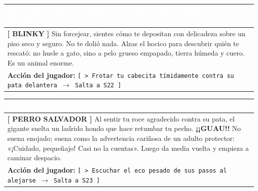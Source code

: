 \documentclass[11pt, a4paper]{article}
\begin{document}
\noindent
\begin{tabularx}{\textwidth}{|X|}
\hline
\rowcolor{colorHeader}
\textbf{\textcolor{white}{PANTALLA S21 $\cdot$ El Gigante de Pelaje Mojado}} \hfill \small\textcolor{white}{Sentido: Tacto y Olor Fuerte} \\ \hline
\rowcolor{colorTextoBox}
\textbf{\textcolor{colorEmisor}{[ BLINKY ]}} \vspace{0.2em}\newline
Sin forcejear, sientes cómo te depositan con delicadeza sobre un piso seco y seguro. No te dolió nada. Alzas el hocico para descubrir quién te rescató: no huele a gato, sino a pelo grueso empapado, tierra húmeda y cuero. Es un animal enorme. \\ \hline
\rowcolor{colorBotonBox}
\textbf{Acción del jugador:} \newline
\texttt{[ > Frotar tu cabecita tímidamente contra su pata delantera $\rightarrow$ Salta a S22 ]} \\ \hline
\end{tabularx}

\vspace{1em}

\noindent
\begin{tabularx}{\textwidth}{|X|}
\hline
\rowcolor{colorHeader}
\textbf{\textcolor{white}{PANTALLA S22 $\cdot$ La Voz del Perro}} \hfill \small\textcolor{white}{Sentido: Oído Grave y Vibración} \\ \hline
\rowcolor{colorTextoBox}
\textbf{\textcolor{colorEmisor}{[ PERRO SALVADOR ]}} \vspace{0.2em}\newline
Al sentir tu roce agradecido contra su pata, el gigante suelta un ladrido hondo que hace retumbar tu pecho. \textbf{¡¡GUAU!!} No suena enojado; suena como la advertencia cariñosa de un adulto protector: «¡Cuidado, pequeñajo! Casi no la cuentas». Luego da media vuelta y empieza a caminar despacio. \\ \hline
\rowcolor{colorBotonBox}
\textbf{Acción del jugador:} \newline
\texttt{[ > Escuchar el eco pesado de sus pasos al alejarse $\rightarrow$ Salta a S23 ]} \\ \hline
\end{tabularx}

\vspace{1em}
\end{document}
